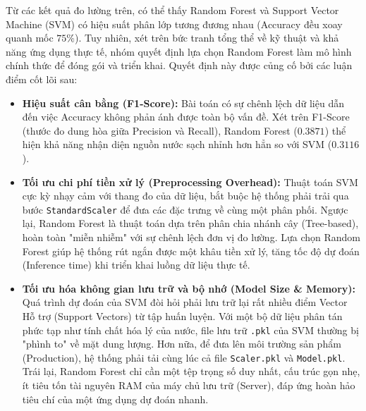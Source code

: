Từ các kết quả đo lường trên, có thể thấy Random Forest và Support Vector Machine (SVM) có hiệu suất phân lớp tương đương nhau (Accuracy đều xoay quanh mốc $75\%$). Tuy nhiên, xét trên bức tranh tổng thể về kỹ thuật và khả năng ứng dụng thực tế, nhóm quyết định lựa chọn Random Forest làm mô hình chính thức để đóng gói và triển khai. Quyết định này được củng cố bởi các luận điểm cốt lõi sau:

\begin{itemize}
    \item \textbf{Hiệu suất cân bằng (F1-Score):} Bài toán có sự chênh lệch dữ liệu dẫn đến việc Accuracy không phản ánh được toàn bộ vấn đề. Xét trên F1-Score (thước đo dung hòa giữa Precision và Recall), Random Forest ($0.3871$) thể hiện khả năng nhận diện nguồn nước sạch nhỉnh hơn hẳn so với SVM ($0.3116$).
    
    \item \textbf{Tối ưu chi phí tiền xử lý (Preprocessing Overhead):} Thuật toán SVM cực kỳ nhạy cảm với thang đo của dữ liệu, bắt buộc hệ thống phải trải qua bước \texttt{StandardScaler} để đưa các đặc trưng về cùng một phân phối. Ngược lại, Random Forest là thuật toán dựa trên phân chia nhánh cây (Tree-based), hoàn toàn "miễn nhiễm" với sự chênh lệch đơn vị đo lường. Lựa chọn Random Forest giúp hệ thống rút ngắn được một khâu tiền xử lý, tăng tốc độ dự đoán (Inference time) khi triển khai luồng dữ liệu thực tế.
    
    \item \textbf{Tối ưu hóa không gian lưu trữ và bộ nhớ (Model Size \& Memory):} Quá trình dự đoán của SVM đòi hỏi phải lưu trữ lại rất nhiều điểm Vector Hỗ trợ (Support Vectors) từ tập huấn luyện. Với một bộ dữ liệu phân tán phức tạp như tính chất hóa lý của nước, file lưu trữ \texttt{.pkl} của SVM thường bị "phình to" về mặt dung lượng. Hơn nữa, để đưa lên môi trường sản phẩm (Production), hệ thống phải tải cùng lúc cả file \texttt{Scaler.pkl} và \texttt{Model.pkl}. Trái lại, Random Forest chỉ cần một tệp trọng số duy nhất, cấu trúc gọn nhẹ, ít tiêu tốn tài nguyên RAM của máy chủ lưu trữ (Server), đáp ứng hoàn hảo tiêu chí của một ứng dụng dự đoán nhanh.
\end{itemize}